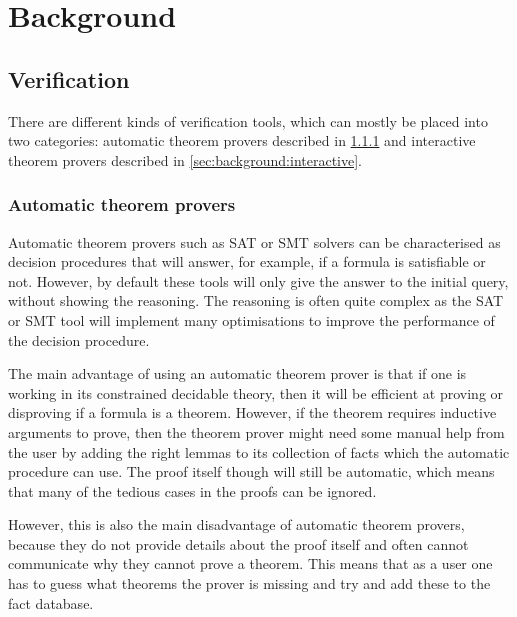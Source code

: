 \chapter{Background}


\section{Verification}

There are different kinds of verification tools, which can mostly be placed into two categories:
automatic theorem provers described in \cref{sec:background:automatic} and interactive
theorem provers described in \cref{sec:background:interactive}.

\subsection{Automatic theorem provers}%
\label{sec:background:automatic}

Automatic theorem provers such as \gls{SAT} or \gls{SMT} solvers can be characterised as decision procedures
that will answer, for example, if a formula is satisfiable or not.  However, by default these tools
will only give the answer to the initial query, without showing the reasoning.  The reasoning is
often quite complex as the \gls{SAT} or \gls{SMT} tool will implement many optimisations to improve the
performance of the decision procedure.

The main advantage of using an automatic theorem prover is that if one is working in its constrained
decidable theory, then it will be efficient at proving or disproving if a formula is a theorem.
However, if the theorem requires inductive arguments to prove, then the theorem prover might need
some manual help from the user by adding the right lemmas to its collection of facts which the
automatic procedure can use.  The proof itself though will still be automatic, which means that many
of the tedious cases in the proofs can be ignored.

However, this is also the main disadvantage of automatic theorem provers, because they do not
provide details about the proof itself and often cannot communicate why they cannot prove a theorem.
This means that as a user one has to guess what theorems the prover is missing and try and add these
to the fact database.

